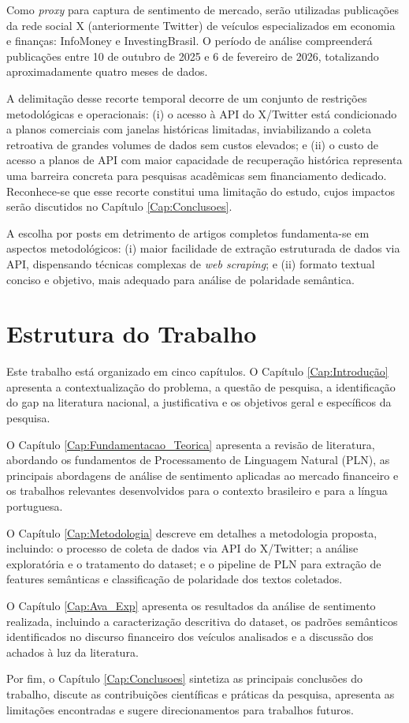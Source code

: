Como \textit{proxy} para captura de sentimento de mercado, serão utilizadas publicações da rede social X (anteriormente Twitter) de veículos especializados em economia e finanças: InfoMoney e InvestingBrasil. O período de análise compreenderá publicações entre 10 de outubro de 2025 e 6 de fevereiro de 2026, totalizando aproximadamente quatro meses de dados.

A delimitação desse recorte temporal decorre de um conjunto de restrições metodológicas e operacionais: (i) o acesso à API do X/Twitter está condicionado a planos comerciais com janelas históricas limitadas, inviabilizando a coleta retroativa de grandes volumes de dados sem custos elevados; e (ii) o custo de acesso a planos de API com maior capacidade de recuperação histórica representa uma barreira concreta para pesquisas acadêmicas sem financiamento dedicado. Reconhece-se que esse recorte constitui uma limitação do estudo, cujos impactos serão discutidos no Capítulo \ref{Cap:Conclusoes}.

A escolha por posts em detrimento de artigos completos fundamenta-se em aspectos metodológicos: (i) maior facilidade de extração estruturada de dados via API, 
dispensando técnicas complexas de \textit{web scraping}; e (ii) formato textual conciso e objetivo, mais adequado para análise de polaridade semântica.


\section{Estrutura do Trabalho}

Este trabalho está organizado em cinco capítulos. O Capítulo \ref{Cap:Introdução} apresenta a contextualização do problema, a questão de pesquisa, a identificação do gap na literatura nacional, a justificativa e os objetivos geral e específicos da pesquisa.

O Capítulo \ref{Cap:Fundamentacao_Teorica} apresenta a revisão de literatura, abordando os fundamentos de Processamento de Linguagem Natural (PLN), as principais abordagens de análise de sentimento aplicadas ao mercado financeiro e os trabalhos relevantes desenvolvidos para o contexto brasileiro e para a língua portuguesa.

O Capítulo \ref{Cap:Metodologia} descreve em detalhes a metodologia proposta, incluindo: o processo de coleta de dados via API do X/Twitter; a análise exploratória e o tratamento do dataset; e o pipeline de PLN para extração de features semânticas e classificação de polaridade dos textos coletados.

O Capítulo \ref{Cap:Ava_Exp} apresenta os resultados da análise de sentimento realizada, incluindo a caracterização descritiva do dataset, os padrões semânticos identificados no discurso financeiro dos veículos analisados e a discussão dos achados à luz da literatura.

Por fim, o Capítulo \ref{Cap:Conclusoes} sintetiza as principais conclusões do trabalho, discute as contribuições científicas e práticas da pesquisa, apresenta as limitações encontradas e sugere direcionamentos para trabalhos futuros.
